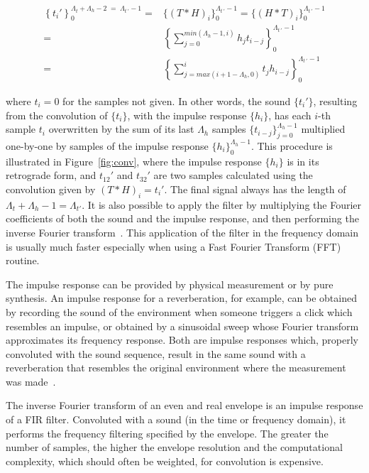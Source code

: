 \begin{equation}\label{eq:conv}
 \begin{split}
 \left\{t_i'\right\}_0^{\Lambda_t+\Lambda_h-2\; = \;\Lambda_{t\, '}-1} = & \{(T*H)_i\}_0^{\Lambda_{t \, '}-1} = \{(H*T)_i\}_0^{\Lambda_{t \, '}-1} \\
     = & \left \{ \sum_{j=0}^{min(\Lambda_h-1,i)}h_{j} t_{i-j} \right \}_0^{\Lambda_{t\, '}-1} 
     \\ = & \left \{ \sum_{j=max(i+1-\Lambda_h,0)}^{i}t_j h_{i-j} \right \}_0^{\Lambda_{t\, '}-1}
 \end{split}
\end{equation}

\noindent where $t_i=0$ for the samples not given.
In other words, the sound $\{t_i'\}$, resulting from the convolution of $\{t_i\}$, with the impulse response $\{h_i\}$, has each $i$-th sample $t_i$ overwritten by the sum of its last $\Lambda_h$ samples $\{t_{i-j}\}_{j=0}^{\Lambda_h-1}$ multiplied one-by-one by samples of the impulse response $\{h_i\}_0^{\Lambda_h-1}$. This procedure is illustrated in Figure~\ref{fig:conv}, where the impulse response $\{h_i\}$ is in its retrograde form, and $t_{12}'$ and $t_{32}'$ are two samples calculated using the convolution given by $(T*H)_i=t_i'$. The final signal always has the length of $\Lambda_t+\Lambda_h -1=\Lambda_{t'}$.
It is also possible to apply the filter by multiplying the Fourier coefficients of both the sound and the impulse response,
and then performing the inverse Fourier transform~\cite{Openheim}.
This application of the filter in the frequency domain is usually much faster
especially when using a Fast Fourier Transform (FFT) routine.

The impulse response can be provided by physical measurement or by pure synthesis.
An impulse response for a reverberation, for example, can be obtained by recording the sound of the environment when someone triggers a click which resembles an impulse, or obtained by a sinusoidal sweep whose Fourier transform approximates its frequency response.
Both are impulse responses which, properly convoluted with the sound sequence, result in the same sound with a reverberation that resembles the original environment where the measurement was made~\cite{Cook}.

The inverse Fourier transform of an even and real envelope is an impulse response of a FIR filter.
Convoluted with a sound (in the time or frequency domain), it performs the frequency filtering specified by the envelope.
The greater the number of samples, the higher the envelope resolution and the computational complexity, which should often be weighted, for convolution is expensive.

